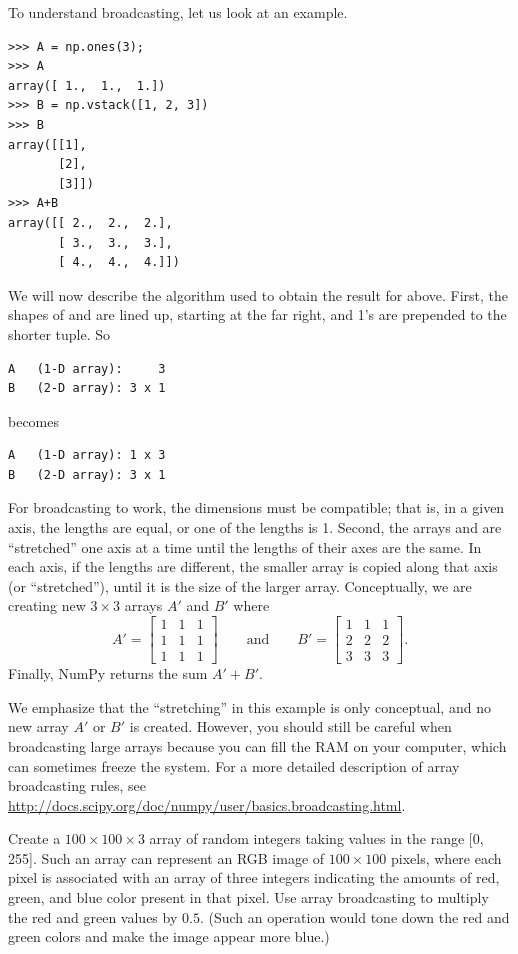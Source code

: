 To understand broadcasting, let us look at an example. 
\begin{lstlisting}
>>> A = np.ones(3);
>>> A
array([ 1.,  1.,  1.])
>>> B = np.vstack([1, 2, 3])
>>> B
array([[1],
       [2],
       [3]])
>>> A+B
array([[ 2.,  2.,  2.],
       [ 3.,  3.,  3.],
       [ 4.,  4.,  4.]])
\end{lstlisting}
We will now describe the algorithm used to obtain the result for  above. 
First, the shapes of  and  are lined up, starting at the far right, and 1's are prepended to the shorter tuple. So
\begin{lstlisting}
A 	(1-D array):     3
B	(2-D array): 3 x 1
\end{lstlisting}
becomes
\begin{lstlisting}
A 	(1-D array): 1 x 3
B	(2-D array): 3 x 1
\end{lstlisting}
For broadcasting to work, the dimensions must be compatible; that is, in a given axis, the lengths are equal, or one of the lengths is 1. 
Second, the arrays  and  are ``stretched'' one axis at a time until the lengths of their axes are the same. 
In each axis, if the lengths are different, the smaller array is copied along that axis (or ``stretched''), until it is the size of the larger array. 
Conceptually, we are creating new $3 \times 3$ arrays $A'$ and $B'$ where
\[
A' = \left[ \begin{array}{ccc}
1 & 1 & 1\\
1 & 1 & 1\\
1 & 1 & 1 \end{array} \right] \qquad \text{and} \qquad B' =  \left[ \begin{array}{ccc}
1 & 1 & 1\\
2 & 2 & 2\\
3 & 3 & 3\end{array} \right].
\]
Finally, NumPy returns the sum $A'+B'$.

We emphasize that the ``stretching'' in this example is only conceptual, and no new array $A'$ or $B'$ is created. However, 
you should still be careful when broadcasting large arrays because you can fill the 
RAM on your computer, which can sometimes freeze the system.
For a more detailed description of array broadcasting rules, see 
\url{http://docs.scipy.org/doc/numpy/user/basics.broadcasting.html}.

\begin{problem}
Create a $100\times100\times3$ array of random integers taking values in the range 
[0, 255]. Such an array can represent an RGB image of $100\times100$ pixels, 
where each pixel is associated with an array of three integers indicating the 
amounts of red, green, and blue color present in that pixel.
Use array broadcasting to multiply the red and green values by $0.5$. 
(Such an operation would tone down the red and green colors and make the 
image appear more blue.) 
\end{problem}

